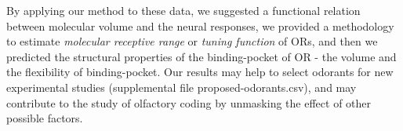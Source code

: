 \documentclass[11pt]{paper} %
\begin{document}
By applying our method to these data, 
we suggested a functional relation between molecular volume and the neural responses, 
we provided a methodology to estimate {\it molecular receptive range} or {\it tuning function} of ORs,
and then we predicted the structural properties of the binding-pocket of OR - the volume and the flexibility of binding-pocket.
Our results may help to select odorants  for new experimental studies (supplemental file proposed-odorants.csv), 
and may contribute to the study of olfactory coding by unmasking the effect of other possible factors.















 
\end{document}
